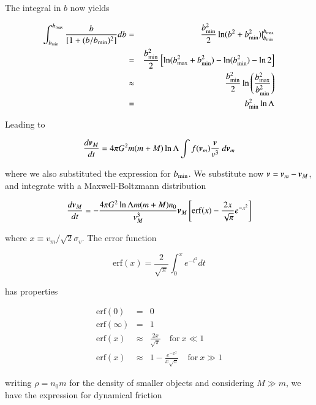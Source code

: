The integral in $b$ now yields 

\begin{eqnarray}
\int_{b_{\rm min}}^{b_{\rm max}}  \frac{b}{[1+(b/b_{\rm min})^2]} db &=& \frac{b_{\rm min}^2}{2} \ln(b^2 +b_{\rm min}^2)\vert_{b_{\rm min}}^{b_{\rm max}}\\
&=& \frac{b_{\rm min}^2}{2} \left[\ln(b_{\rm max}^2 +b_{\rm min}^2) - \ln(b_{\rm min}^2) -\ln 2 \right]\\
&\approx& \frac{b_{\rm min}^2}{2} \ln\left(\frac{b_{\rm max}^2}{b_{\rm min}^2}\right)\\
&=& b_{\rm min}^2 \ln\Lambda\\
\end{eqnarray}

Leading to 

\begin{equation}
\frac{d{\boldsymbol{v}}_M}{dt} = 4\pi G^2 m (m+M) \ln\Lambda \int f({\boldsymbol{v}}_m) \frac{{\boldsymbol{v}}}{v^3}  \  d{\boldsymbol{v}}_m 
\end{equation}

where we also substituted the expression for $b_{\rm min}$. We substitute now ${\boldsymbol{v}} = {\boldsymbol{v}}_m - {\boldsymbol{v}}_M$, and integrate with a Maxwell-Boltzmann distribution

\begin{equation}
\frac{d{\boldsymbol{v}}_M}{dt} = -\frac{4 \pi G^2 \ln\Lambda m (m+M) n_0}{v_M^3} {\boldsymbol{v}}_M \left[\mathrm{erf}(x) - \frac{2x}{\sqrt{\pi}} e^{-x^2} \right]
\end{equation}


where $x\equiv v_m /\sqrt{2}\sigma_v$. The error function 

\begin{equation}
\mathrm{erf}(x) = \frac{2}{\sqrt{\pi}} \int_0^x e^{-t^2} dt 
\end{equation}

has properties

\begin{eqnarray}
\mathrm{erf}(0) &=& 0 \\
\mathrm{erf}(\infty) &=& 1 \\
\mathrm{erf}(x) &\approx& \frac{2x}{\sqrt{\pi}} \quad \mathrm{for} \ x \ll 1 \\
\mathrm{erf}(x) &\approx& 1 - \frac{e^{-x^2}}{x\sqrt{\pi}} \quad \mathrm{for} \ x \gg 1 
\end{eqnarray}

writing $\rho = n_0 m$ for the density of smaller objects and considering $M \gg m$, we have the expression for dynamical friction

